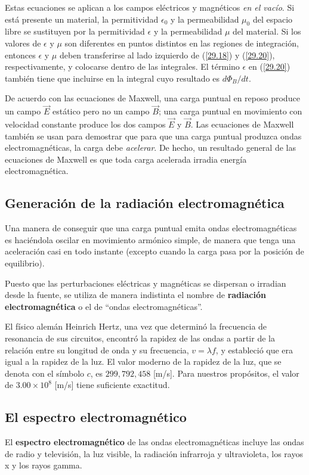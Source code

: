 Estas ecuaciones se aplican a los campos eléctricos y magnéticos \textit{en el vacío}. Si está presente un material, la permitividad $\epsilon_0$ y la permeabilidad $\mu_0$ del espacio libre se sustituyen por la permitividad $\epsilon$ y la permeabilidad $\mu$ del material. Si los valores de $\epsilon$ y $\mu$ son diferentes en puntos distintos en las regiones de integración, entonces $\epsilon$ y $\mu$ deben transferirse al lado izquierdo de (\ref{29.18}) y (\ref{29.20}), respectivamente, y colocarse dentro de las integrales. El término $\epsilon$ en (\ref{29.20}) también tiene que incluirse en la integral cuyo resultado es $d\Phi_B/dt$.

De acuerdo con las ecuaciones de Maxwell, una carga puntual en reposo produce
un campo $\vec{E}$ estático pero no un campo $\vec{B}$; una carga puntual en movimiento con velocidad constante produce los dos campos $\vec{E}$ y $\vec{B}$. Las ecuaciones de Maxwell también se usan para demostrar que para que una carga puntual produzca ondas electromagnéticas, la carga debe \textit{acelerar}. De hecho, un resultado general de las ecuaciones de Maxwell es que toda carga acelerada irradia energía electromagnética.

\subsection{Generación de la radiación electromagnética}
Una manera de conseguir que una carga puntual emita ondas electromagnéticas es haciéndola oscilar en movimiento armónico simple, de manera que tenga una aceleración casi en todo instante (excepto cuando la carga pasa por la posición de equilibrio).

Puesto que las perturbaciones eléctricas y magnéticas se dispersan o irradian desde la fuente, se utiliza de manera indistinta el nombre de \textbf{radiación electromagnética} o el de “ondas electromagnéticas”.

El físico alemán Heinrich Hertz, una vez que determinó la frecuencia de resonancia de sus circuitos, encontró la rapidez de las ondas a partir de la relación entre su longitud de onda y su frecuencia, $v=\lambda f$, y estableció que era igual a la rapidez de la luz. El valor moderno de la rapidez de la luz, que se denota con el símbolo $c$, es $299,792,458$ [m/s]. Para nuestros propósitos, el valor de $3.00 \times 10^8$ [m/s] tiene suficiente exactitud.

\subsection{El espectro electromagnético}
 El \textbf{espectro electromagnético} de las ondas electromagnéticas incluye las ondas de radio y televisión, la luz visible, la radiación infrarroja y ultravioleta, los rayos x y los rayos gamma.
 
